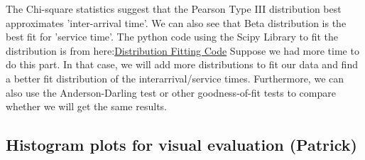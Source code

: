 \documentclass{article}
\begin{document}
The Chi-square statistics suggest that the Pearson Type III distribution best approximates 'inter-arrival time'. We can also see that Beta distribution is the best fit for 'service time'. The python code using the Scipy Library to fit the distribution is from here:\href{https://github.com/mungoliabhishek/Distribution-Fitting-Used_Car_Dataset/blob/master/Workbook.ipynb}{Distribution Fitting Code} Suppose we had more time to do this part. In that case, we will add more distributions to fit our data and find a better fit distribution of the interarrival/service times. Furthermore, we can also use the Anderson-Darling test or other goodness-of-fit tests to compare whether we will get the same results.

\subsection{Histogram plots for visual evaluation (Patrick)}
\end{document}
